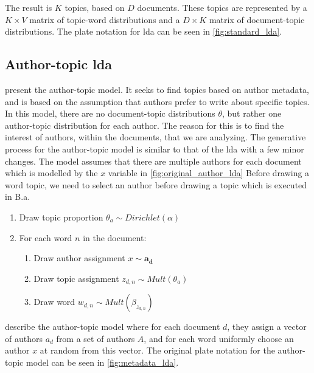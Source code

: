 The result is $K$ topics, based on $D$ documents.
These topics are represented by a $K \times V$ matrix of topic-word distributions and a $D \times K$ matrix of document-topic distributions.
The plate notation for \gls{lda} can be seen in \autoref{fig:standard_lda}.





\subsection{Author-topic \gls{lda}}\label{subsec:auth_prelim} 
\citet{author_topic_2012} present the author-topic model.
It seeks to find topics based on author metadata, and is based on the assumption that authors prefer to write about specific topics.
In this model, there are no document-topic distributions $\theta$, but rather one author-topic distribution for each author.
The reason for this is to find the interest of authors, within the documents, that we are analyzing.
The generative process for the author-topic model is similar to that of the \gls{lda} with a few minor changes.
The model assumes that there are multiple authors for each document which is modelled by the $x$ variable in \autoref{fig:original_author_lda}
Before drawing a word topic, we need to select an author before drawing a topic which is executed in B.a.
\vspace{\topsep}
\begin{enumerate}
	\item Draw topic proportion $\theta_a \sim Dirichlet(\alpha)$
	\item For each word $n$ in the document:
	\begin{enumerate}
		\item Draw author assignment $x \sim \boldsymbol{a_d}$
		\item Draw topic assignment $z_{d,n} \sim Mult(\theta_a)$
		\item Draw word $w_{d,n} \sim Mult(\beta_{z_{d,n}})$
	\end{enumerate}
\end{enumerate}
\vspace{\topsep}

\citet{author_topic_2012} describe the author-topic model where for each document $d$, they assign a vector of authors $a_d$ from a set of authors $A$, and for each word uniformly choose an author $x$ at random from this vector.
The original plate notation for the author-topic model can be seen in \autoref{fig:metadata_lda}.

